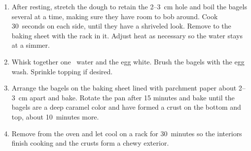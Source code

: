\begin{recipe}
\begin{enumerate}
  \item After resting, stretch the dough to retain the 2--3~cm hole
    and boil the bagels several at a time, making sure they have room
    to bob around. Cook 30~seconds on each side, until they have a
    shriveled look.  Remove to the baking sheet with the rack in
    it. Adjust heat as necessary so the water stays at a simmer.

  \item Whisk together one \tbsp\ water and the egg white. Brush the
    bagels with the egg wash.  Sprinkle topping if desired.

  \item Arrange the bagels on the baking sheet lined with parchment
    paper about 2--3~cm apart and bake. Rotate the pan after 15 minutes
    and bake until the bagels are a deep caramel color and have formed
    a crust on the bottom and top, about 10~minutes more.

  \item Remove from the oven and let cool on a rack for 30~minutes so
    the interiors finish cooking and the crusts form a chewy exterior.

  \end{enumerate}
\end{recipe}
